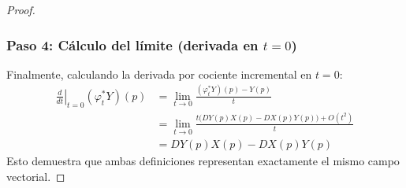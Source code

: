 \documentclass[11pt,a4paper]{article}
\theoremstyle{definition}
\theoremstyle{plain}
\theoremstyle{remark}
\begin{document}
\begin{proof}
		\subsubsection*{Paso 4: Cálculo del límite (derivada en $t=0$)}
		Finalmente, calculando la derivada por cociente incremental en $t=0$:
		\[
		\begin{aligned}
			\left. \frac{d}{dt} \right|_{t=0} (\varphi_t^* Y)(p) &= \lim_{t \to 0} \frac{(\varphi_t^* Y)(p) - Y(p)}{t} \\
			&= \lim_{t \to 0} \frac{t \Big( DY(p) X(p) - DX(p) Y(p) \Big) + O(t^2)}{t} \\
			&= DY(p) X(p) - DX(p) Y(p)
		\end{aligned}
		\]
		Esto demuestra que ambas definiciones representan exactamente el mismo campo vectorial.
	\end{proof}
\end{document}
